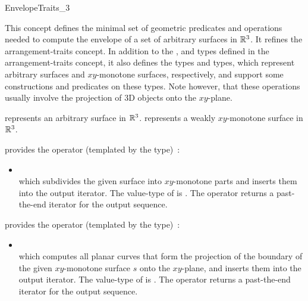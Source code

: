 \ccRefPageBegin

\begin{ccRefConcept}{EnvelopeTraits_3}

\ccDefinition

This concept defines the minimal set of geometric predicates and
operations needed to compute the envelope of a set of arbitrary
surfaces in $\mathbb{R}^3$. It refines the arrangement-traits concept.
In addition to the ,  and
 types defined in the arrangement-traits concept, it
also defines the types  and 
types, which represent arbitrary surfaces and $xy$-monotone surfaces,
respectively, and support some constructions and predicates on these
types. Note however, that these operations usually involve the
projection of 3D objects onto the $xy$-plane.

\ccRefines
{}

\ccTypes

{represents an arbitrary surface in $\mathbb{R}^3$.}
\ccGlue
{}
{represents a weakly $xy$-monotone surface in $\mathbb{R}^3$.}


\ccThreeToTwo

{provides the operator (templated by the  type)~:
 \begin{itemize}
 \item {} \\
 which subdivides the given surface  into $xy$-monotone parts
 and inserts them into the output iterator. 
 The value-type of  is .
 The operator returns a past-the-end iterator for the output sequence.
 \end{itemize}}

{provides the operator (templated by the  type)~:
 \begin{itemize}
 \item {} \\
 which computes all planar curves that form the projection of the
 boundary of the given $xy$-monotone surface $s$ onto the $xy$-plane,
 and inserts them into the output iterator. 
 The value-type of  is .
 The operator returns a past-the-end iterator for the output sequence.
 \end{itemize}}
 

\end{ccRefConcept}
